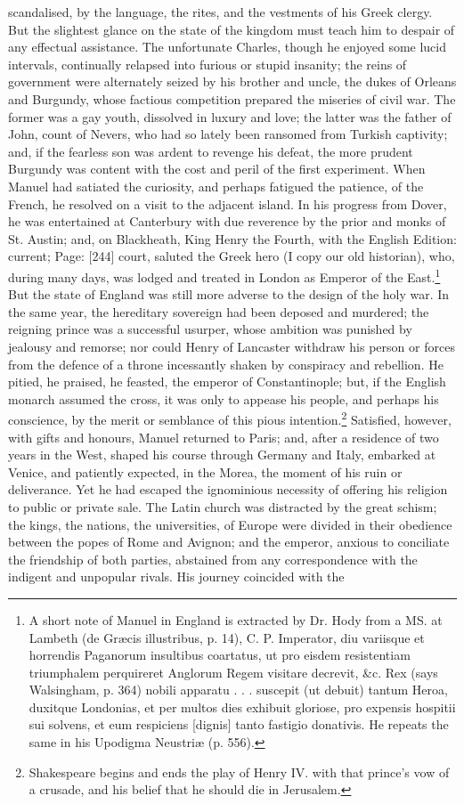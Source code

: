 scandalised, by the language, the rites, and the vestments of his Greek clergy. But the slightest glance on the state of the kingdom must teach him to despair of any effectual assistance. The unfortunate Charles, though he enjoyed some lucid intervals, continually relapsed into furious or stupid insanity; the reins of government were alternately seized by his brother and uncle, the dukes of Orleans and Burgundy, whose factious competition prepared the miseries of civil war. The former was a gay youth, dissolved in luxury and love; the latter was the father of John, count of Nevers, who had so lately been ransomed from Turkish captivity; and, if the fearless son was ardent to revenge his defeat, the more prudent Burgundy was content with the cost and peril of the first experiment. When Manuel had satiated the curiosity, and perhaps fatigued the patience, of the French, he resolved on a visit to the adjacent island. In his progress from Dover, he was entertained at Canterbury with due reverence by the prior and monks of St. Austin; and, on Blackheath, King Henry the Fourth, with the English Edition: current; Page: [244] court, saluted the Greek hero (I copy our old historian), who, during many days, was lodged and treated in London as Emperor of the East.\footnote{A short note of Manuel in England is extracted by Dr. Hody from a MS. at Lambeth (de Græcis illustribus, p. 14), C. P. Imperator, diu variisque et horrendis Paganorum insultibus coartatus, ut pro eisdem resistentiam triumphalem perquireret Anglorum Regem visitare decrevit, \&c. Rex (says Walsingham, p. 364) nobili apparatu . . . suscepit (ut debuit) tantum Heroa, duxitque Londonias, et per multos dies exhibuit gloriose, pro expensis hospitii sui solvens, et eum respiciens [dignis] tanto fastigio donativis. He repeats the same in his Upodigma Neustriæ (p. 556).} But the state of England was still more adverse to the design of the holy war. In the same year, the hereditary sovereign had been deposed and murdered; the reigning prince was a successful usurper, whose ambition was punished by jealousy and remorse; nor could Henry of Lancaster withdraw his person or forces from the defence of a throne incessantly shaken by conspiracy and rebellion. He pitied, he praised, he feasted, the emperor of Constantinople; but, if the English monarch assumed the cross, it was only to appease his people, and perhaps his conscience, by the merit or semblance of this pious intention.\footnote{Shakespeare begins and ends the play of Henry IV. with that prince\texthebrew{}’s vow of a crusade, and his belief that he should die in Jerusalem.} Satisfied, however, with gifts and honours, Manuel returned to Paris; and, after a residence of two years in the West, shaped his course through Germany and Italy, embarked at Venice, and patiently expected, in the Morea, the moment of his ruin or deliverance. Yet he had escaped the ignominious necessity of offering his religion to public or private sale. The Latin church was distracted by the great schism; the kings, the nations, the universities, of Europe were divided in their obedience between the popes of Rome and Avignon; and the emperor, anxious to conciliate the friendship of both parties, abstained from any correspondence with the indigent and unpopular rivals. His journey coincided with the 